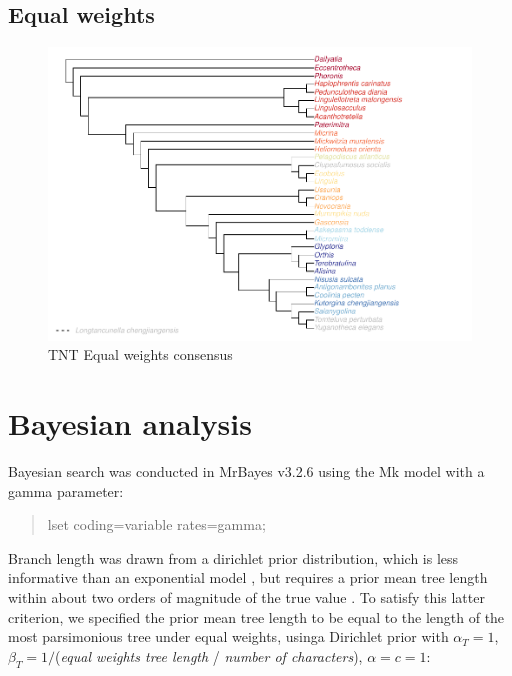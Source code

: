\documentclass[]{book}
\theoremstyle{definition}
\theoremstyle{definition}
\theoremstyle{definition}
\theoremstyle{remark}
\begin{document}
\hypertarget{equal-weights}{%
\section{Equal weights}\label{equal-weights}}

\begin{figure}
\centering
\includegraphics{Brachiopod_phylogeny_files/figure-latex/unnamed-chunk-9-1.pdf}
\caption{\label{fig:unnamed-chunk-9}TNT Equal weights consensus}
\end{figure}

\hypertarget{bayesian-analysis}{%
\chapter{Bayesian analysis}\label{bayesian-analysis}}

Bayesian search was conducted in MrBayes v3.2.6 \citep{Ronquist2012}
using the Mk model \citep{Lewis2001} with a gamma parameter:

\begin{quote}
lset coding=variable rates=gamma;
\end{quote}

Branch length was drawn from a dirichlet prior distribution, which is
less informative than an exponential model \citep{Rannala2012}, but
requires a prior mean tree length within about two orders of magnitude
of the true value \citep{Zhang2012}. To satisfy this latter criterion,
we specified the prior mean tree length to be equal to the length of the
most parsimonious tree under equal weights, usinga Dirichlet prior with
\(α_T = 1\), \(β_T = 1/\)(\emph{equal weights tree length} /
\emph{number of characters}), \(α = c = 1\):
\end{document}
